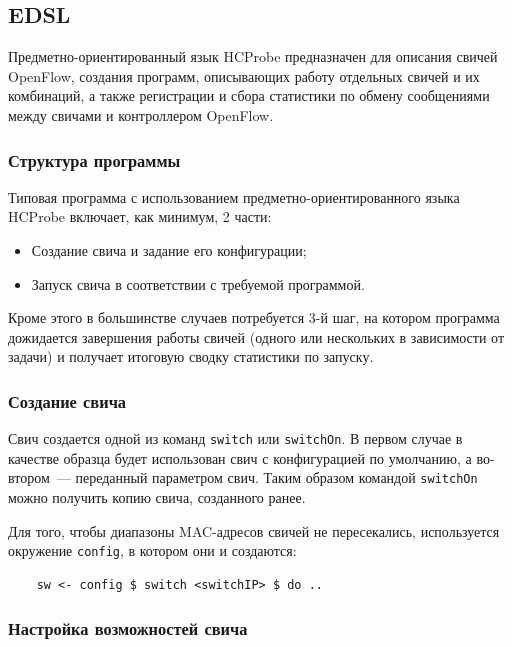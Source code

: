 \documentclass[9pt,a4paper]{article}
\begin{document}
\subsection{EDSL}

Предметно-ориентированный язык HCProbe предназначен для описания свичей OpenFlow, создания программ, описывающих работу отдельных свичей и их
комбинаций, а также регистрации и сбора статистики по обмену
сообщениями между свичами и контроллером OpenFlow.

\subsubsection{Структура программы}

Типовая программа с использованием предметно-ориентированного языка HCProbe включает, как минимум, 2 части:

\begin{itemize}
  \item Создание свича и задание его конфигурации;
  \item Запуск свича в соответствии с требуемой программой.
\end{itemize}

Кроме этого в большинстве случаев потребуется 3-й шаг, на котором программа дожидается
завершения работы свичей (одного или нескольких в зависимости от задачи) и получает
итоговую сводку статистики по запуску.

\subsubsection{Создание свича}

Свич создается одной из команд \lstinline!switch! или \lstinline!switchOn!. В первом случае
в качестве образца будет использован свич с конфигурацией по умолчанию, а во-втором~--- переданный параметром свич. Таким образом командой \lstinline!switchOn! можно получить
копию свича, созданного ранее.

Для того, чтобы диапазоны MAC-адресов свичей не пересекались, используется окружение
\lstinline!config!, в котором они и создаются:

\begin{lstlisting}
    sw <- config $ switch <switchIP> $ do ..
\end{lstlisting}%

\subsubsection{Настройка возможностей свича}
\end{document}
